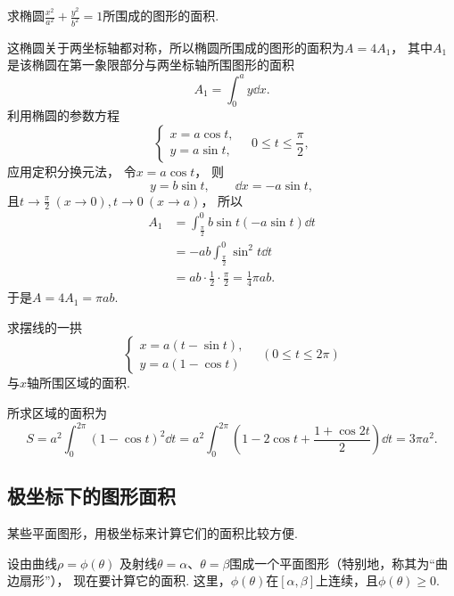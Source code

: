 \begin{example}
求椭圆\(\frac{x^2}{a^2}+\frac{y^2}{b^2}=1\)所围成的图形的面积.
\begin{solution}
这椭圆关于两坐标轴都对称，所以椭圆所围成的图形的面积为\(A=4A_1\)，
其中\(A_1\)是该椭圆在第一象限部分与两坐标轴所围图形的面积\[
	A_1 = \int_0^a y \dd{x}.
\]
利用椭圆的参数方程\[
	\left\{ \begin{array}{l}
		x = a \cos t, \\
		y = a \sin t,
	\end{array} \right.
	\quad 0 \leq t \leq \frac\pi2,
\]
应用定积分换元法，
令\(x = a \cos t\)，
则\[
	y = b \sin t, \qquad
	\dd{x} = -a \sin t,
\]
且\(t \to \frac\pi2\ (x\to0),
t \to 0\ (x \to a)\)，
所以\begin{align*}
	A_1 &= \int_{\frac\pi2}^0 b \sin t (-a \sin t) \dd{t} \\
	&= -ab \int_{\frac\pi2}^0 \sin^2t \dd{t} \\
	&= ab \cdot \frac12 \cdot \frac\pi2
	= \frac14 \pi ab.
\end{align*}
于是\(A = 4 A_1 = \pi ab\).
\end{solution}
\end{example}

\begin{example}
求摆线的一拱\[
	\left\{ \begin{array}{l}
		x = a (t - \sin t), \\
		y = a (1 - \cos t)
	\end{array} \right.
	\quad(0 \leq t \leq 2\pi)
\]与\(x\)轴所围区域的面积.
\begin{solution}
所求区域的面积为\[
	S = a^2 \int_0^{2\pi} (1-\cos t)^2 \dd{t}
	= a^2 \int_0^{2\pi} \left(
		1 - 2 \cos t + \frac{1 + \cos2t}2
	\right) \dd{t}
	= 3\pi a^2.
\]
\end{solution}
\end{example}

\subsection{极坐标下的图形面积}
某些平面图形，用极坐标来计算它们的面积比较方便.

设由曲线\(\rho = \phi(\theta)\)
及射线\(\theta=\alpha\)、\(\theta=\beta\)围成一个平面图形（特别地，称其为“曲边扇形”），
现在要计算它的面积.
这里，\(\phi(\theta)\)在\([\alpha,\beta]\)上连续，且\(\phi(\theta)\geq0\).

